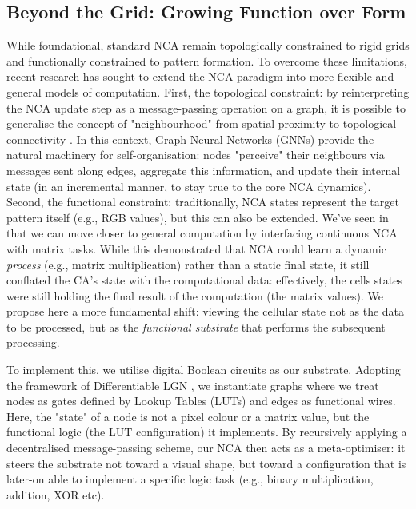 \subsection*{Beyond the Grid: Growing Function over Form}
While foundational, standard NCA remain topologically constrained to rigid grids and functionally constrained to pattern formation. To overcome these limitations, recent research has sought to extend the NCA paradigm into more flexible and general models of computation.
First, the topological constraint: by reinterpreting the NCA update step as a message-passing operation on a graph, it is possible to generalise the concept of "neighbourhood" from spatial proximity to topological connectivity \citep{grattarola_learning_2021}. In this context, Graph Neural Networks (GNNs) provide the natural machinery for self-organisation: nodes "perceive" their neighbours via messages sent along edges, aggregate this information, and update their internal state (in an incremental manner, to stay true to the core NCA dynamics).
Second, the functional constraint: traditionally, NCA states represent the target pattern itself (e.g., RGB values), but this can also be extended. We've seen in  that we can move closer to general computation by interfacing continuous NCA with matrix tasks. While this demonstrated that NCA could learn a dynamic \textit{process} (e.g., matrix multiplication) rather than a static final state, it still conflated the CA's state with the computational data: effectively, the cells states were still holding the final result of the computation (the matrix values).
We propose here a more fundamental shift: viewing the cellular state not as the data to be processed, but as the \textit{functional substrate} that performs the subsequent processing.


To implement this, we utilise digital Boolean circuits as our substrate. Adopting the framework of Differentiable \acf{LGN} \citep{petersen_deep_2022}, we instantiate graphs where we treat nodes as gates defined by Lookup Tables (LUTs) and edges as functional wires.
Here, the "state" of a node is not a pixel colour or a matrix value, but the functional logic (the LUT configuration) it implements. By recursively applying a decentralised message-passing scheme, our NCA then acts as a meta-optimiser: it steers the substrate not toward a visual shape, but toward a configuration that is later-on able to implement a specific logic task (e.g., binary multiplication, addition, XOR etc).


